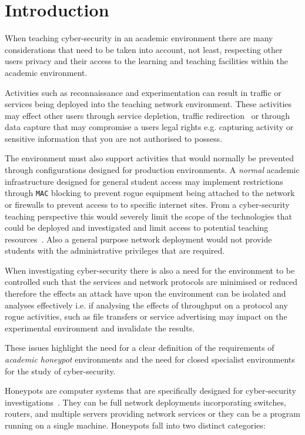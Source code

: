 \section{Introduction}\label{intro}
When teaching cyber-security in an academic environment there are many considerations that need to be taken into account, not least, respecting other users privacy and their access to the learning and teaching facilities within the academic environment.

Activities such as reconnaissance and experimentation can result in traffic or services being deployed into the teaching network environment. These activities may effect other users through service depletion, traffic redirection~\cite{ACGO:06,LR:06} or through data capture that may compromise a users legal rights e.g. capturing activity or sensitive information that you are not authorised to possess.

The environment must also support activities that would normally be prevented through configurations designed for production environments. A \emph{normal} academic infrastructure designed for general student access may implement restrictions through \texttt{MAC} blocking to prevent rogue equipment being attached to the network or firewalls to prevent access to to specific internet sites. From a cyber-security teaching perspective this would severely limit the scope of the technologies that could be deployed and investigated and limit access to potential teaching resources~\cite{ACGO:06,YYLCHJ:04}. Also a general purpose network deployment would not provide students with the administrative privileges that are required.

When investigating cyber-security there is also a need for the environment to be controlled such that the services and network protocols are minimised or reduced  therefore the effects an attack have upon the environment can be isolated and analyses effectively i.e. if analysing the effects of throughput on a protocol any rogue activities, such as file transfers or service advertising may impact on the experimental environment and invalidate the results.

These issues highlight the need for a clear definition of the requirements of \emph{academic honeypot} environments and the need for closed specialist environments for the study of cyber-security.

Honeypots are computer systems that are specifically designed for cyber-security investigations~\cite{FKAS:17,BCF:12,ZZQL:03}. They can be full network deployments incorporating switches, routers, and multiple servers providing network services or they can be a program running on a single machine. Honeypots fall into two distinct categories: 


